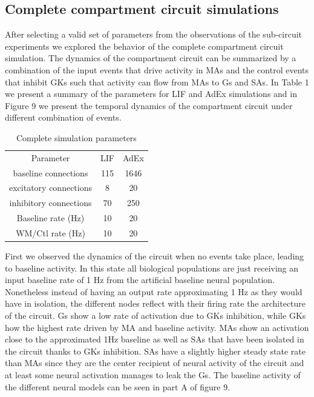 \documentclass[10pt]{article}
\begin{document}
\subsection{Complete compartment circuit simulations}

{\label{444332}}

After selecting a valid set of parameters from the observations of the
sub-circuit experiments we explored the behavior of the complete
compartment circuit simulation. The dynamics of the compartment
circuit can be summarized by a combination of the input events that
drive activity in MAs and the control events that inhibit GKs such
that activity can flow from MAs to Gs and SAs. In Table 1 we present a
summary of the parameters for LIF and AdEx simulations and in Figure 9
we present the temporal dynamics of the compartment circuit under
different combination of events.

\begin{table}[h!]
  \centering \normalsize
  \begin{tabular}{ccc}
    Parameter & LIF & AdEx \\
    baseline connections & 115 & 1646 \\
    excitatory connections & 8 & 20 \\
    inhibitory connections & 70 & 250 \\
    Baseline rate (Hz) & 10 & 20 \\
    WM/Ctl rate (Hz) & 10 & 20 \\
  \end{tabular}
  \caption{Complete simulation parameters}
  \label{917316}
\end{table}

First we observed the dynamics of the circuit when no events take
place, leading to baseline activity. In this state all biological
populations are just receiving an input baseline rate of 1 Hz from the
artificial baseline neural population. Nonetheless instead of having
an output rate approximating 1 Hz as they would have in isolation, the
different nodes reflect with their firing rate the architecture of the
circuit. Gs show a low rate of activation due to GKs inhibition, while
GKs how the highest rate driven by MA and baseline activity. MAs show
an activation close to the approximated 1Hz baseline as well as SAs
that have been isolated in the circuit thanks to GKs inhibition. SAs
have a slightly higher steady state rate than MAs since they are the
center recipient of neural activity of the circuit and at least some
neural activation manages to leak the Gs. The baseline activity of the
different neural models can be seen in part A of figure 9.
\end{document}
